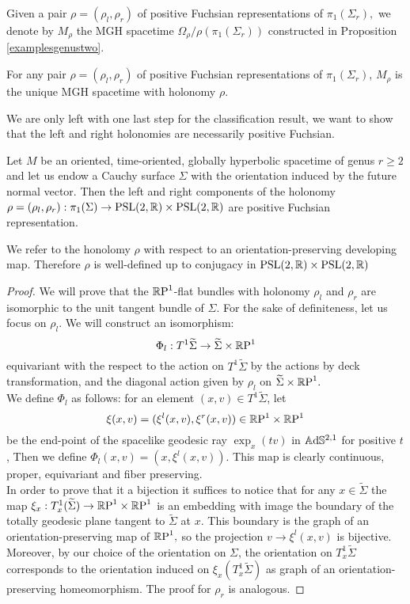 Given a pair $\rho=(\rho_l,\rho_r)$ of positive Fuchsian representations of $\pi_1(\Sigma_r),$ we denote by $M_\rho$ the MGH spacetime $\Omega_\rho/\rho(\pi_1(\Sigma_r))$ constructed in Proposition \ref{examplesgenustwo}.

\begin{corollary}
    For any pair $\rho=(\rho_l,\rho_r)$ of positive Fuchsian representations of $\pi_1(\Sigma_r)$, $M_\rho$ is the unique MGH spacetime with holonomy $\rho$.
\end{corollary}

We are only left with one last step for the classification result, we want to show that the left and right holonomies are necessarily positive Fuchsian. 

\begin{proposition}
    Let $M$ be an oriented, time-oriented, globally hyperbolic spacetime of genus $r\geq 2$ and let us endow a Cauchy surface $\Sigma$ with the orientation induced by the future normal vector. Then the left and right components of the holonomy $\rho=(\rho_l,\rho_r):\pi_1(\Sigma)\to\text{PSL}(2,\R)\times\text{PSL}(2,\R)$ are positive Fuchsian representation. 
\end{proposition}

\begin{observation}
We refer to the honolomy $\rho$ with respect to an orientation-preserving developing map. Therefore $\rho$ is well-defined up to conjugacy in $\text{PSL}(2,\R)\times\text{PSL}(2,\R)$
\end{observation}
\begin{proof}
    We will prove that the $\S$-flat bundles with holonomy $\rho_l$ and $\rho_r$ are isomorphic to the unit tangent bundle of $\Sigma.$ For the sake of definiteness, let us focus on $\rho_l$. We will construct an isomorphism: 
    \[
        \Phi_l:T^1\widetilde{\Sigma}\to \widetilde{\Sigma}\times\S
    \]
    equivariant with the respect to the action on $T^1\widetilde{\Sigma}$ by the actions by deck transformation, and the diagonal action given by $\rho_l$ on $\widetilde{\Sigma}\times\S.$ \\
    We define $\Phi_l$ as follows: for an element $(x,v)\in T^1\widetilde{\Sigma}$, let 
    \[
        \xi(x,v)=(\xi^l(x,v),\xi^r(x,v))\in \T
    \]
    be the end-point of the spacelike geodesic ray $\exp_x(tv)$ in $\A^{2,1}$ for positive $t$, Then we define $\Phi_l(x,v)=(x,\xi^l(x,v)).$ This map is clearly continuous, proper, equivariant and fiber preserving. \\
    In order to prove that it a bijection it suffices to notice that for any $x\in\widetilde{\Sigma}$ the map $\xi_x:T_x^1(\widetilde{\Sigma})\to\T$ is an embedding with image the boundary of the totally geodesic plane tangent to $\widetilde{\Sigma}$ at $x$. This boundary is the graph of an orientation-preserving map of $\S,$ so the projection $v\to\xi^l(x,v)$ is bijective. Moreover, by our choice of the orientation on $\Sigma$, the orientation on $T_x^1\widetilde{\Sigma}$ corresponds to the orientation induced on $\xi_x(T^1_x\widetilde{\Sigma})$ as graph of an orientation-preserving homeomorphism. The proof for $\rho_r$ is analogous.
\end{proof}



